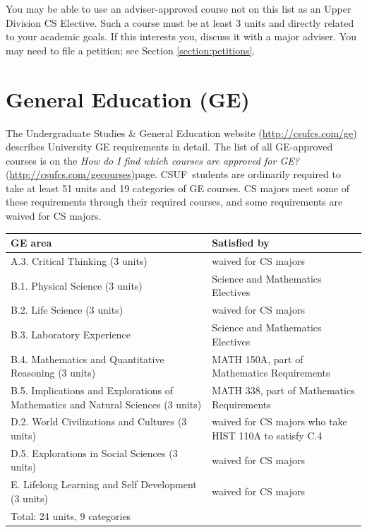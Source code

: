 \documentclass{book}
\newcommand{\CampusName}{CSUF}
\newcommand{\shrunkurl}[1]{\url{http://csufcs.com/#1}}
\begin{document}
You may be able to use an adviser-approved course not on this list as an Upper Division CS Elective. Such a course must be at least 3 units and directly related to your academic goals. If this interests you, discuss it with a major adviser. You may need to file a petition; see Section \ref{section:petitions}.

\section{General Education (GE)}

\newcommand{\gecourselist}{\emph{How do I find which courses are approved for GE?} (\shrunkurl{gecourses})}

The Undergraduate Studies \& General Education website (\shrunkurl{ge}) describes University GE requirements in detail. The list of all GE-approved courses is on the \gecourselist page. \CampusName~students are ordinarily required to take at least 51 units and 19 categories of GE courses. CS majors meet some of these requirements through their required courses, and some requirements are waived for CS majors.

\begin{center}
\begin{tabular}{| p{3in} | p{3in} |} \hline
  \textbf{GE area} & \textbf{Satisfied by} \\ \hline
  A.3. Critical Thinking (3 units) & waived for CS majors \\ \hline
  B.1. Physical Science (3 units) & Science and Mathematics Electives \\ \hline
  B.2. Life Science (3 units) & waived for CS majors \\ \hline
  B.3. Laboratory Experience & Science and Mathematics Electives \\ \hline
  B.4. Mathematics and Quantitative Reasoning (3 units) & MATH 150A, part of Mathematics Requirements \\ \hline
  B.5. Implications and Explorations of Mathematics and Natural Sciences (3 units) & MATH 338, part of Mathematics Requirements \\ \hline
  D.2. World Civilizations and Cultures (3 units) & waived for CS majors who take HIST 110A to satisfy C.4 \\ \hline
  D.5. Explorations in Social Sciences (3 units) & waived for CS majors \\ \hline
  E. Lifelong Learning and Self Development (3 units) & waived for CS majors \\ \hline
  \multicolumn{2}{|l|}{Total: 24 units, 9 categories} \\ \hline
\end{tabular}
\end{center}
\end{document}
